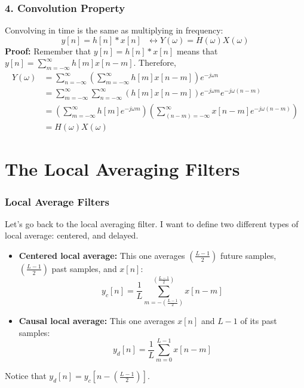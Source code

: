 \documentclass{beamer}
\begin{document}
\begin{frame}
  \frametitle{4. Convolution Property}

  Convolving in time is the same as multiplying in frequency:
  \[
  y[n]=h[n]\ast x[n]~~~\leftrightarrow
  Y(\omega)=H(\omega)X(\omega)
  \]
  {\bf Proof:}
  Remember that $y[n]=h[n]\ast x[n]$ means that $y[n]=\sum_{m=-\infty}^\infty h[m]x[n-m]$.  Therefore,
  \begin{align*}
    Y(\omega) &= \sum_{n=-\infty}^{\infty}\left(\sum_{m=-\infty}^\infty h[m]x[n-m]\right)e^{-j\omega n}\\
    &= \sum_{m=-\infty}^{\infty}\sum_{n=-\infty}^\infty\left(h[m]x[n-m]\right)e^{-j\omega m}e^{-j\omega (n-m)}\\
    &= \left(\sum_{m=-\infty}^{\infty}h[m]e^{-j\omega m}\right)
    \left(\sum_{(n-m)=-\infty}^\infty  x[n-m]e^{-j\omega (n-m)}\right)\\
    &= H(\omega)X(\omega)
  \end{align*}
\end{frame}

\section[Averaging]{The Local Averaging Filters}
\setcounter{subsection}{1}

\begin{frame}
  \frametitle{Local Average Filters}

  Let's go back to the local averaging filter. I want to define two 
  different types of local average: centered, and delayed.
  \begin{itemize}
  \item {\bf Centered local average:} This one averages
    $\left(\frac{L-1}{2}\right)$ future samples,
    $\left(\frac{L-1}{2}\right)$ past samples, and $x[n]$:
    \[
    y_c[n] = \frac{1}{L}\sum_{m=-\left(\frac{L-1}{2}\right)}^{\left(\frac{L-1}{2}\right)} x[n-m]
    \]
  \item {\bf Causal local average:} This one averages $x[n]$ and $L-1$ of its
    past samples:
    \[
    y_d[n] = \frac{1}{L}\sum_{m=0}^{L-1} x[n-m]
    \]
  \end{itemize}
  Notice that $y_d[n] = y_c\left[n-\left(\frac{L-1}{2}\right)\right]$.
\end{frame}
\end{document}
